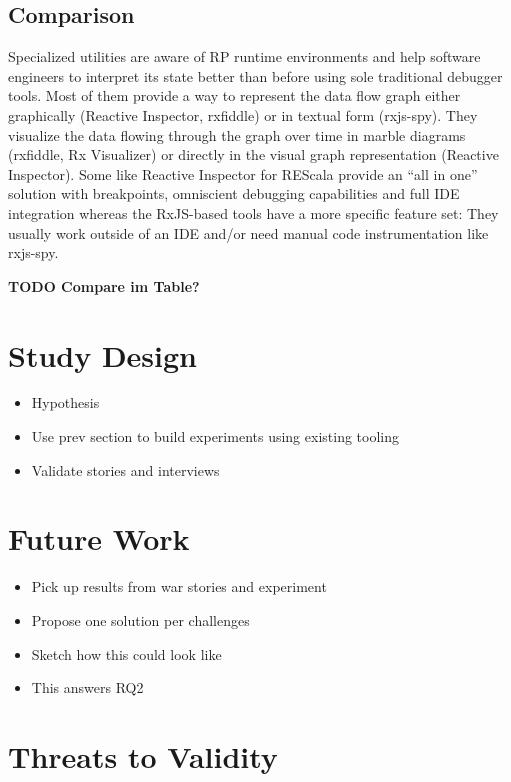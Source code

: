 \documentclass[12pt,a4paper]{article}
\begin{document}
\subsection{Comparison}

Specialized utilities are aware of RP runtime environments and help software engineers to interpret its state better than before using sole traditional debugger tools. Most of them provide a way to represent the data flow graph either graphically (Reactive Inspector, rxfiddle) or in textual form (rxjs-spy). They visualize the data flowing through the graph over time in marble diagrams (rxfiddle, Rx Visualizer) or directly in the visual graph representation (Reactive Inspector). Some like Reactive Inspector for REScala provide an ``all in one'' solution with breakpoints, omniscient debugging capabilities and full IDE integration whereas the RxJS-based tools have a more specific feature set: They usually work outside of an IDE and/or need manual code instrumentation like rxjs-spy.

\textbf{TODO Compare im Table?}


\section{Study Design}
\label{sec:study}

\begin{itemize}
	\item Hypothesis
	\item Use prev section to build experiments using existing tooling
	\item Validate stories and interviews
\end{itemize}

\section{Future Work}
\label{sec:future}

\begin{itemize}
	\item Pick up results from war stories and experiment
	\item Propose one solution per challenges
	\item Sketch how this could look like
	\item This answers RQ2
\end{itemize}

\section{Threats to Validity}
\label{sec:threats}
\end{document}
